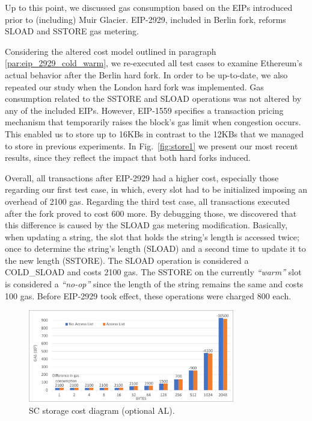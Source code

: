 Up to this point, we discussed gas consumption based on the EIPs introduced prior to (including) Muir Glacier. EIP-2929, included in Berlin fork, reforms SLOAD and SSTORE gas metering.

Considering the altered cost model outlined in paragraph \ref{par:eip_2929_cold_warm}, we re-executed all test cases to examine Ethereum’s actual behavior after the Berlin hard fork. In order to be up-to-date, we also repeated our study when the London hard fork was implemented. Gas consumption related to the SSTORE and SLOAD operations was not altered by any of the included EIPs. However, EIP-1559 specifies a transaction pricing mechanism that temporarily raises the block’s gas limit when congestion occurs. This enabled us to store up to 16KBs in contrast to the 12KBs that we managed to store in previous experiments. In Fig.~\ref{fig:store1} we present our most recent results, since they reflect the impact that both hard forks induced.

Overall, all transactions after EIP-2929 had a higher cost, especially those regarding our first test case, in which, every slot had to be initialized imposing an overhead of 2100 gas. Regarding the third test case, all transactions executed after the fork proved to cost 600 more. By debugging those, we discovered that this difference is caused by the SLOAD gas metering modification. Basically, when updating a string, the slot that holds the string’s length is accessed twice; once to determine the string’s length (SLOAD) and a second time to update it to the new length (SSTORE). The SLOAD operation is considered a COLD\_SLOAD and costs 2100 gas. The SSTORE on the currently \emph{``warm''} slot is considered a \emph{``no-op''} since the length of the string remains the same and costs 100 gas. Before EIP-2929 took effect, these operations were charged 800 each.

\begin{figure}[htbp]
\centerline{\includegraphics[width=9cm]{figs/access_list.pdf}}
\caption{SC storage cost diagram (optional AL).}
\label{fig:access_list}
\end{figure}

